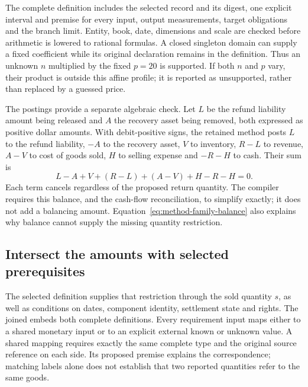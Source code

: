 The complete  definition includes the selected
 record and its digest, one explicit interval and
premise for every input, output measurements, target obligations and the branch
limit. Entity, book, date, dimensions and scale are checked before arithmetic
is lowered to rational formulas. A closed singleton domain can supply a fixed
coefficient while its original declaration remains in the definition. Thus an
unknown \(n\) multiplied by the fixed \(p=20\) is supported. If both \(n\)
and \(p\) vary, their product is outside this affine profile; it is reported
as unsupported, rather than replaced by a guessed price.

The postings provide a separate algebraic check. Let \(L\) be the refund
liability amount being released and \(A\) the recovery asset being removed,
both expressed as positive dollar amounts. With debit-positive signs, the
retained method posts \(L\) to the refund liability, \(-A\) to the recovery
asset, \(V\) to inventory, \(R-L\) to revenue, \(A-V\) to cost of goods
sold, \(H\) to selling expense and \(-R-H\) to cash. Their sum is
\begin{equation}
\label{eq:method-family-balance}
 L-A+V+(R-L)+(A-V)+H-R-H=0.
\end{equation}
Each term cancels regardless of the proposed return quantity. The compiler
requires this balance, and the cash-flow reconciliation, to simplify exactly;
it does not add a balancing amount. Equation~\eqref{eq:method-family-balance}
also explains why balance cannot supply the missing quantity restriction.

\subsection{Intersect the amounts with selected prerequisites}

The selected  definition supplies that restriction
through the sold quantity \(s\), as well as conditions on dates, component
identity, settlement state and rights. The joined
 embeds both complete definitions. Every
requirement input maps either to a shared monetary input or to an explicit
external known or unknown value. A shared mapping requires exactly the same
complete type and the original source reference on each side. Its proposed
premise explains the correspondence; matching labels alone does not establish
that two reported quantities refer to the same goods.

